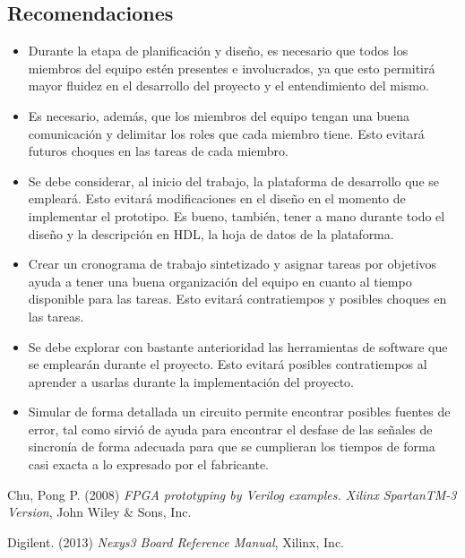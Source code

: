 \documentclass[12pt,a4paper]{article}
\begin{document}
\subsection{Recomendaciones}
\begin{itemize}

    \item Durante la etapa de planificación y diseño, es necesario que todos los miembros del equipo estén presentes e involucrados, ya que esto permitirá mayor fluidez en el desarrollo del proyecto y el entendimiento del mismo.
    \item Es necesario, además, que los miembros del equipo tengan una buena comunicación y delimitar los roles que cada miembro tiene. Esto evitará futuros choques en las tareas de cada miembro.
    \item Se debe considerar, al inicio del trabajo, la plataforma de desarrollo que se empleará. Esto evitará modificaciones en el diseño en el momento de implementar el prototipo. Es bueno, también, tener a mano durante todo el diseño y la descripción en HDL, la hoja de datos de la plataforma.
    \item Crear un cronograma de trabajo sintetizado y asignar tareas por objetivos ayuda a tener una buena organización del equipo en cuanto al tiempo disponible para las tareas. Esto evitará contratiempos y posibles choques en las tareas.
    \item Se debe explorar con bastante anterioridad las herramientas de software que se emplearán durante el proyecto. Esto evitará posibles contratiempos al aprender a usarlas durante la implementación del proyecto.
    \item Simular de forma detallada un circuito permite encontrar posibles fuentes de error, tal como sirvió de ayuda para encontrar el desfase de las señales de sincronía de forma adecuada para que se cumplieran los tiempos de forma casi exacta a lo expresado por el fabricante.
    
\end{itemize}

\begin{thebibliography}{3}

Chu, Pong P. (2008)
\newblock \emph{FPGA prototyping by Verilog examples. Xilinx SpartanTM-3 Version},
\newblock John Wiley \& Sons, Inc.

Digilent. (2013)
\newblock \emph{Nexys3 Board Reference Manual},
\newblock Xilinx, Inc.

\end{thebibliography}
\end{document}

